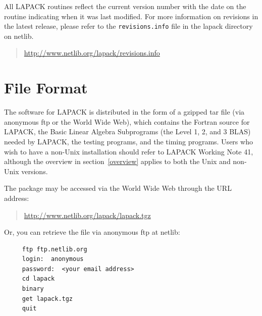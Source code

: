 \documentclass[11pt]{report}
\begin{document}
All LAPACK routines reflect the current version number with the date
on the routine indicating when it was last modified.
For more information on revisions in the latest release, please refer
to the \texttt{revisions.info} file in the lapack directory on netlib.
\begin{quote}
\url{http://www.netlib.org/lapack/revisions.info}
\end{quote}

%

\section{File Format}\label{fileformat}

The software for LAPACK is distributed in the form of a
gzipped tar file (via anonymous ftp or the World Wide Web),
which contains the Fortran source for LAPACK,
the Basic Linear Algebra Subprograms
(the Level 1, 2, and 3 BLAS) needed by LAPACK, the testing programs,
and the timing programs.
Users who wish to have a non-Unix installation should refer to LAPACK
Working Note 41,
although the overview in section~\ref{overview} applies to both the Unix and non-Unix
versions.

The package may be accessed via the World Wide Web through
the URL address:
\begin{quote}
\url{http://www.netlib.org/lapack/lapack.tgz}
\end{quote}

Or, you can retrieve the file via anonymous ftp at netlib:

\begin{verbatim}
     ftp ftp.netlib.org
     login:  anonymous
     password:  <your email address>
     cd lapack
     binary
     get lapack.tgz
     quit
\end{verbatim}
\end{document}
